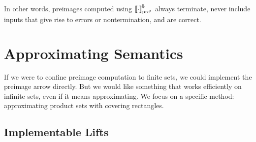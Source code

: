 \documentclass{llncs}
\newcommand{\conv}{^{\mspace{-2mu}\Downarrow\mspace{-2mu}}}
\newcommand{\meaningofconv}[1]{\left\llbracket{#1}\right\rrbracket\conv}
\newcommand{\ppre}{_\mathrm{pre^{\mspace{-2mu}*}}}
\begin{document}
In other words, preimages computed using $\meaningofconv{\cdot}\ppre$ always terminate, never include inputs that give rise to errors or nontermination, and are correct.


\section{Approximating Semantics}
\label{sec:approximating-semantics}

If we were to confine preimage computation to finite sets, we could implement the preimage arrow directly.
But we would like something that works efficiently on infinite sets, even if it means approximating.
We focus on a specific method: approximating product sets with covering rectangles.

\subsection{Implementable Lifts}
\end{document}

